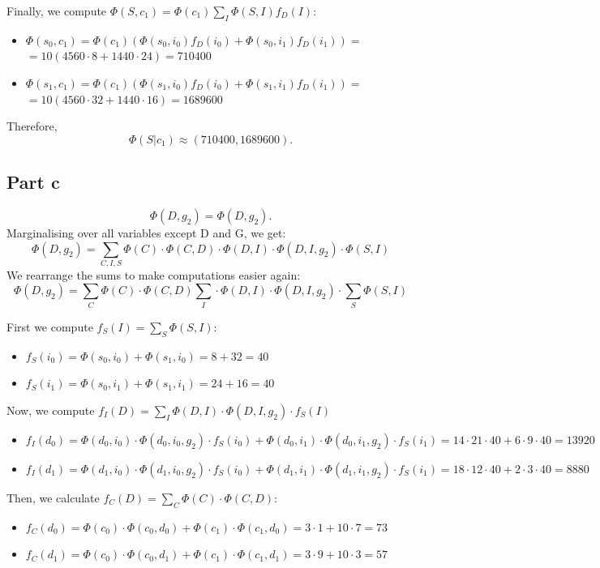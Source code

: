 \documentclass[11pt,a4paper]{article}
\begin{document}
	Finally, we compute $\Phi(S, c_1) = \Phi(c_1)  \sum_I \Phi(S, I) f_D(I): $
	\begin{itemize}
		\item $ \Phi(s_0, c_1) = \Phi(c_1) ( \Phi(s_0, i_0) f_D(i_0) + \Phi(s_0, i_1) f_D(i_1))  = $ \\
		$= 10 (4560 \cdot 8 + 1440 \cdot 24) = 710400$
		\item $ \Phi(s_1, c_1) = \Phi(c_1) ( \Phi(s_1, i_0) f_D(i_0) + \Phi(s_1, i_1) f_D(i_1))  = $ \\
		$= 10 (4560 \cdot 32 + 1440 \cdot 16) = 1689600$
	\end{itemize}
	
	Therefore, $$ \Phi(S | c_1) \approx (710400, 1689600). $$
	
	\subsection*{Part c}
	$$ \Phi(D, g_2) = \Phi(D, g_2).$$
	Marginalising over all variables except D and G, we get:
	$$ \Phi(D, g_2) = \sum_{C,I,S}\Phi(C) \cdot \Phi(C,D) \cdot \Phi(D,I) \cdot \Phi(D,I,g_2) \cdot \Phi(S, I) $$
	We rearrange the sums to make computations easier again:
	$$ \Phi(D, g_2) = \sum_{C}\Phi(C) \cdot \Phi(C,D) \sum_{I}\cdot \Phi(D,I) \cdot \Phi(D,I,g_2) \cdot \sum_{S}\Phi(S, I) $$
	
	First we compute $f_S(I) = \sum_{S}\Phi(S,I) $:   
	\begin{itemize}
		\item $ f_S(i_0) = \Phi(s_0, i_0) +\Phi(s_1, i_0) = 8 + 32 = 40$
		\item $ f_S(i_1) = \Phi(s_0, i_1) +\Phi(s_1, i_1) = 24 + 16 = 40$
	\end{itemize}  
	
	Now, we compute $f_I(D) = \sum_{I} \Phi(D,I) \cdot \Phi(D,I,g_2) \cdot f_S(I)$ 
	\begin{itemize}
		\item $ f_I(d_0) = \Phi(d_0, i_0) \cdot \Phi(d_0, i_0, g_2) \cdot f_S(i_0) +  \Phi(d_0, i_1) \cdot \Phi(d_0, i_1, g_2) \cdot f_S(i_1) = 14 \cdot 21 \cdot 40 + 6 \cdot 9 \cdot 40 = 13920 $
		\item $ f_I(d_1) = \Phi(d_1, i_0) \cdot \Phi(d_1, i_0, g_2) \cdot f_S(i_0) + \Phi(d_1, i_1) \cdot \Phi(d_1, i_1, g_2) \cdot f_S(i_1) = 18 \cdot 12 \cdot 40 + 2 \cdot 3 \cdot 40 = 8880 $
	\end{itemize}  
	
	Then, we calculate $f_C(D) = \sum_{C} \Phi(C) \cdot \Phi(C,D)$:
	\begin{itemize}
		\item $ f_C(d_0) = \Phi(c_0) \cdot \Phi(c_0, d_0) + \Phi(c_1) \cdot \Phi(c_1, d_0) = 3 \cdot 1 + 10 \cdot 7 = 73 $
		\item $ f_C(d_1) = \Phi(c_0) \cdot \Phi(c_0, d_1) + \Phi(c_1) \cdot \Phi(c_1, d_1) = 3 \cdot 9 + 10 \cdot 3 = 57 $
	\end{itemize}  
	
\end{document}
